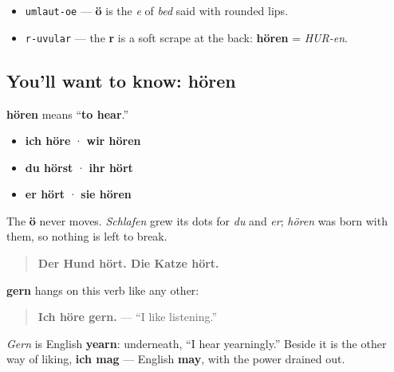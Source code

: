 \begin{sounds}
\begin{itemize}
\raggedright
  \item \texttt{umlaut-oe} — \textbf{ö} is the \emph{e} of \emph{bed} said with rounded lips.
  \item \texttt{r-uvular} — the \textbf{r} is a soft scrape at the back: \textbf{hören} = \emph{HUR-en}.
\end{itemize}
\end{sounds}

\subsection*{You'll want to know: hören}
\textbf{hören} means \textquotedblleft{}\textbf{to hear}.\textquotedblright{}

\begin{itemize}
\raggedright
  \item \textbf{ich höre} · \textbf{wir hören}
  \item \textbf{du hörst} · \textbf{ihr hört}
  \item \textbf{er hört} · \textbf{sie hören}
\end{itemize}

The \textbf{ö} never moves. \emph{Schlafen} grew its dots for \emph{du} and \emph{er}; \emph{hören} was born with them, so nothing is left to break.

\begin{quote}
\textbf{Der Hund hört. Die Katze hört.}
\end{quote}

\begin{grammarlens}[title={Grammar Lens: liking it, the mögen way}]
\textbf{gern} hangs on this verb like any other:

\begin{quote}
\textbf{Ich höre gern.} — \textquotedblleft{}I like listening.\textquotedblright{}
\end{quote}

\emph{Gern} is English \textbf{yearn}: underneath, \textquotedblleft{}I hear yearningly.\textquotedblright{} Beside it is the other way of liking, \textbf{ich mag} — English \textbf{may}, with the power drained out.
\end{grammarlens}

